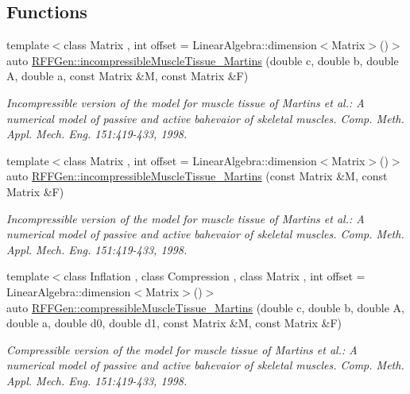\subsection*{Functions}
\begin{DoxyCompactItemize}
\item 
{\footnotesize template$<$class Matrix , int offset = Linear\-Algebra\-::dimension$<$\-Matrix$>$()$>$ }\\auto \hyperlink{group__Biomechanics_ga6c85de42ee96ce8b8505dd22d2327e12}{R\-F\-F\-Gen\-::incompressible\-Muscle\-Tissue\-\_\-\-Martins} (double c, double b, double A, double a, const Matrix \&M, const Matrix \&F)
\begin{DoxyCompactList}\small\item\em Incompressible version of the model for muscle tissue of Martins et al.\-: A numerical model of passive and active bahevaior of skeletal muscles. Comp. Meth. Appl. Mech. Eng. 151\-:419-\/433, 1998. \end{DoxyCompactList}\item 
{\footnotesize template$<$class Matrix , int offset = Linear\-Algebra\-::dimension$<$\-Matrix$>$()$>$ }\\auto \hyperlink{group__Biomechanics_ga79c7b90af1f57945e9c1c8e547d6e9ee}{R\-F\-F\-Gen\-::incompressible\-Muscle\-Tissue\-\_\-\-Martins} (const Matrix \&M, const Matrix \&F)
\begin{DoxyCompactList}\small\item\em Incompressible version of the model for muscle tissue of Martins et al.\-: A numerical model of passive and active bahevaior of skeletal muscles. Comp. Meth. Appl. Mech. Eng. 151\-:419-\/433, 1998. \end{DoxyCompactList}\item 
{\footnotesize template$<$class Inflation , class Compression , class Matrix , int offset = Linear\-Algebra\-::dimension$<$\-Matrix$>$()$>$ }\\auto \hyperlink{group__Biomechanics_gaaa21bcb424d6ea5a591e454bcfa9cec1}{R\-F\-F\-Gen\-::compressible\-Muscle\-Tissue\-\_\-\-Martins} (double c, double b, double A, double a, double d0, double d1, const Matrix \&M, const Matrix \&F)
\begin{DoxyCompactList}\small\item\em Compressible version of the model for muscle tissue of Martins et al.\-: A numerical model of passive and active bahevaior of skeletal muscles. Comp. Meth. Appl. Mech. Eng. 151\-:419-\/433, 1998. \end{DoxyCompactList}\item 

\end{DoxyCompactItemize}
